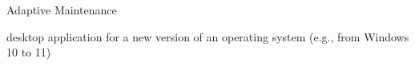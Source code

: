 

\begin{frame}{Adaptive Maintenance}
	\begin{fancycolumns}
		\begin{definition}{\insertsubsection\mysource{\lientzswanson}}
			 \hfill {}
		\end{definition}
		\begin{example}{}
			desktop application for a new version of an operating system (e.g., from Windows 10 to 11)
		\end{example}
		\nextcolumn
	\end{fancycolumns}
\end{frame}


